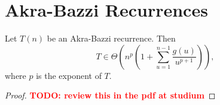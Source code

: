 
\section*{Akra-Bazzi Recurrences}

\begin{theorem}
    Let $T(n)$ be an Akra-Bazzi recurrence.
    Then \[
    T \in \Theta\left( n^{p}\left( 1 + \sum_{u=1}^{n-1} \frac{g(u)}{u^{p+1}} \right)  \right) 
    ,\] where $p$ is the exponent of $T$.
\end{theorem}
\begin{proof}
    \textcolor{red}{\textbf{TODO: review this in the pdf at studium}}
\end{proof}

